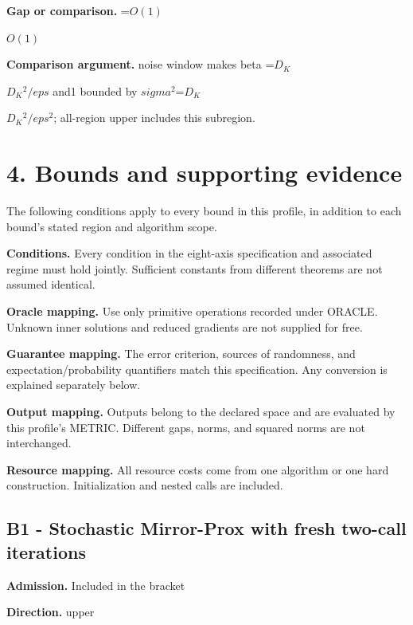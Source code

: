 \documentclass[10pt,a4paper]{article}
\newcommand{\AtlasMath}[1]{\par\begingroup\centering\setbox0=\hbox{$\displaystyle #1$}\ifdim\wd0>1.4\linewidth\typeout{ATLAS WIDE FORMULA: \the\wd0}\fi\ifdim\wd0>\linewidth\resizebox{\linewidth}{!}{\box0}\else\box0\fi\par\endgroup}
\newcommand{\AtlasInlineMath}[1]{\begingroup\setbox0=\hbox{$#1$}\ifdim\wd0>.4\linewidth\endgroup\AtlasMath{#1}\else\endgroup$#1$\fi}
\begin{document}
\textbf{Gap or comparison.} \AtlasInlineMath{O(1)}



\textbf{Comparison argument.} noise window makes beta \AtlasInlineMath{D_K}$^2/eps$ and1 bounded by $sigma^2$\AtlasInlineMath{D_K}$^2/eps^2$; all-region upper includes this subregion.



\section{4. Bounds and supporting evidence}


The following conditions apply to every bound in this profile, in addition to each bound's stated region and algorithm scope.



\textbf{Conditions.} Every condition in the eight-axis specification and associated regime must hold jointly. Sufficient constants from different theorems are not assumed identical.



\textbf{Oracle mapping.} Use only primitive operations recorded under ORACLE. Unknown inner solutions and reduced gradients are not supplied for free.



\textbf{Guarantee mapping.} The error criterion, sources of randomness, and expectation/probability quantifiers match this specification. Any conversion is explained separately below.



\textbf{Output mapping.} Outputs belong to the declared space and are evaluated by this profile's METRIC. Different gaps, norms, and squared norms are not interchanged.



\textbf{Resource mapping.} All resource costs come from one algorithm or one hard construction. Initialization and nested calls are included.



\subsection{B1 - Stochastic Mirror-Prox with fresh two-call iterations}


\textbf{Admission.} Included in the bracket



\textbf{Direction.} upper
\end{document}
